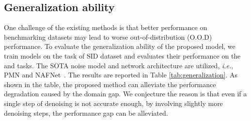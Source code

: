 \documentclass[10pt,twocolumn,letterpaper]{article}
\def\ie{\textit{i.e.}}
\begin{document}
\subsection{Generalization ability}
\vspace{-0.05cm}
One challenge of the existing methods is that better performance on benchmarking datasets may lead to worse out-of-distribution (O.O.D) performance. To evaluate the generalization ability of the proposed model, we train models on the  task of SID dataset \cite{chen2018learning} and evaluates their performance on the  and  tasks. The SOTA noise model and network architecture are utilized, \ie, PMN \cite{feng2022learnability} and NAFNet~\cite{chen2022simple}. The results are reported in Table \ref{tab:generalization}. As shown in the table, the proposed method can alleviate the performance degradation caused by the domain gap. We conjecture the reason is that even if a single step of denoising is not accurate enough, by involving slightly more denoising steps, the performance gap can be alleviated.   

\begin{table}[tbp]
    \centering


    \vspace{-0.1cm}
    \caption{The generalization ability of methods on O.O.D tasks. The models are trained on the  task and evaluated on  and  tasks. All the models use the same SOTA noise model PMN~\cite{feng2022learnability} and backbone NAFNet-2~\cite{chen2022simple}. \textit{Baseline} is not equipped with the improved architecture and the proposed training paradigm.}
    \label{tab:generalization}
    \vspace{-0.3cm}
\end{table}

\vspace{-0.1cm}
\end{document}
